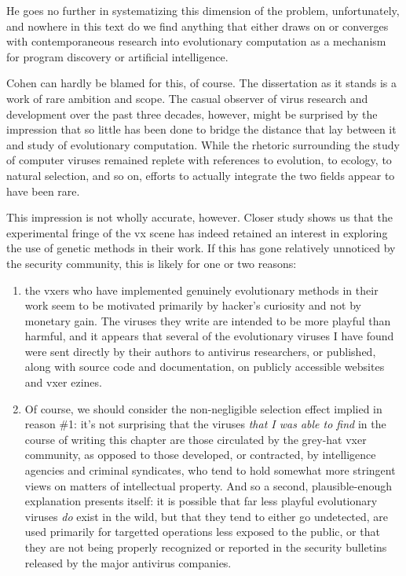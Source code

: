 \documentclass[12pt,glossary]{dalthesis}
\begin{document}
He goes no further in systematizing this dimension of the problem,
unfortunately, and nowhere in this text do we find anything that either draws on
or converges with contemporaneous research into evolutionary computation as a
mechanism for program discovery or artificial intelligence.

Cohen can hardly be blamed for this, of course. The dissertation as it stands is
a work of rare ambition and scope. The casual observer of virus research and
development over the past three decades, however, might be surprised by the
impression that so little has been done to bridge the distance that lay between
it and study of evolutionary computation. While the rhetoric surrounding the
study of computer viruses remained replete with references to evolution, to
ecology, to natural selection, and so on,  efforts to actually
integrate the two fields appear to have been rare.

This impression is not wholly accurate, however. Closer study shows us that the
experimental fringe of the \gls{vx} scene has indeed retained an interest in exploring
the use of genetic methods in their work. If this has gone relatively unnoticed
by the security community, this is likely for one or two reasons:

\begin{enumerate}
\item the \glspl{vxer} who have implemented genuinely evolutionary methods in their
work seem to be motivated primarily by hacker's curiosity and not by monetary
gain. The viruses they write are intended to be more
playful than harmful, and it appears that several of the evolutionary viruses
I have found were sent directly by their authors to antivirus researchers, or
published, along with source code and documentation, on publicly accessible
websites and \gls{vxer} ezines.

\item Of course, we should consider the non-negligible selection
effect implied in reason \#1: it's not surprising that the viruses \emph{that I was
able to find} in the course of writing this chapter are those circulated by
the grey-hat \gls{vxer} community, as opposed to those developed, or contracted, by
intelligence agencies and criminal syndicates, who tend to hold somewhat more
stringent views on matters of intellectual property. And so a second,
plausible-enough explanation presents itself: it is possible that far less
playful evolutionary viruses \emph{do} exist in the wild, but that they tend to
either go undetected, are used primarily for targetted operations less
exposed to the public, or that they are not being properly recognized or
reported in the security bulletins released by the major antivirus companies.
\end{enumerate}
\end{document}
